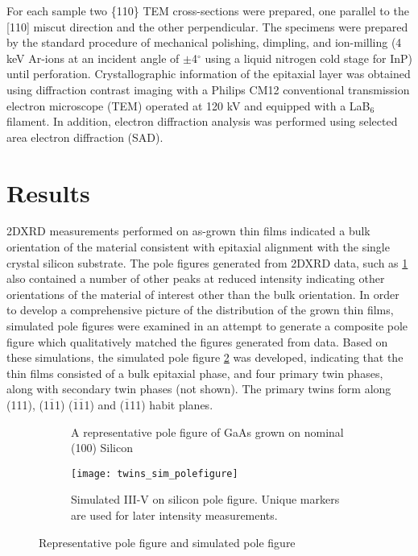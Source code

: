 For each sample two \{110\} TEM cross-sections were prepared, one parallel to 
the [110] miscut direction and the other perpendicular. The specimens were 
prepared by the standard procedure of mechanical polishing, dimpling, and 
ion-milling (4 keV Ar-ions at an incident angle of \(\pm\)4\(^\circ\) using a 
liquid nitrogen cold stage for InP) until perforation. Crystallographic 
information of the epitaxial layer was obtained using diffraction contrast 
imaging with a Philips CM12 conventional transmission electron microscope 
(TEM) operated at 120 kV and equipped with a LaB\(_6\) filament. In addition, 
electron diffraction analysis was performed using selected area electron 
diffraction (SAD).
\section{Results}
2DXRD measurements performed on as-grown thin films indicated a bulk 
orientation of the material consistent with epitaxial alignment with the 
single crystal silicon substrate. The pole figures generated from 2DXRD data, 
such as \cref{fig:twins_pole_example} also contained a number of other peaks 
at reduced intensity indicating other orientations of the material of interest 
other than the bulk orientation. In order to develop a comprehensive picture 
of the distribution of the grown thin films, simulated pole figures were 
examined in an attempt to generate a composite pole figure which qualitatively 
matched the figures generated from data. Based on these simulations, the 
simulated pole figure \cref{fig:twins_sim_polefigure} was developed, 
indicating that the thin films consisted of a bulk epitaxial phase, and four 
primary twin phases, along with secondary twin phases (not shown). The primary twins form 
along (111), (1\(\overline{1}\)1) (\(\overline{1}\overline{1}\)1) and (\(\overline{1}\)11) 
habit planes.
\begin{figure}
    \begin{subfigure}[b]{0.5\linewidth}
        \centering
        \caption{A representative pole figure of GaAs grown on nominal (100) 
        Silicon\label{fig:twins_pole_example}}
    \end{subfigure}
    \begin{subfigure}[b]{0.5\linewidth}
        \centering
        \texttt{[image: twins\_sim\_polefigure]}
        \caption{Simulated III-V on silicon pole figure. Unique markers are used 
        for later intensity measurements.\label{fig:twins_sim_polefigure}}
    \end{subfigure}
    \caption{\label{fig:polefigure_example}Representative pole figure and simulated pole 
    figure}
\end{figure}

